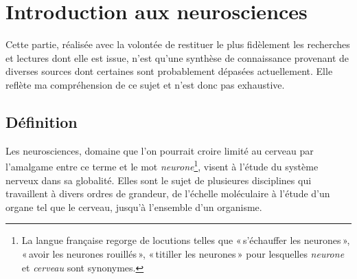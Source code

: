 \documentclass[12pt,fleqn,oneside,openany]{book} %
\begin{document}
\section{Introduction aux neurosciences} \label{sec:introNeuro}
\begin{remark}
	Cette partie, réalisée avec la volontée de restituer le plus fidèlement les recherches et lectures dont elle est issue, n'est qu'une synthèse de connaissance provenant de diverses sources dont certaines sont probablement dépasées actuellement. Elle reflète ma compréhension de ce sujet et n'est donc pas exhaustive.
\end{remark}

\subsection[Définition]{Définition \cite{wikineuro}} \label{ssec:definition} %
Les neurosciences, domaine que l'on pourrait croire limité au cerveau par l'amalgame entre ce terme et le mot \emph{neurone}\footnote{La langue française regorge de locutions telles que «\,s'échauffer les neurones\,», «\,avoir les neurones rouillés\,», «\,titiller les neurones\,» pour lesquelles \emph{neurone} et \emph{cerveau} sont synonymes.}, visent à l'étude du système nerveux dans sa globalité. Elles sont le sujet de plusieures disciplines qui travaillent à divers ordres de grandeur, de l'échelle moléculaire à l'étude d'un organe tel que le cerveau, jusqu'à l'ensemble d'un organisme. 

\begin{figure}[h]
\end{figure}
\end{document}
